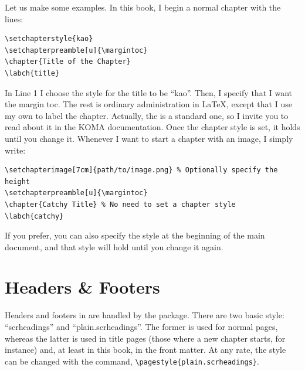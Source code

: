 Let us make some examples. In this book, I begin a normal chapter with 
the lines:
\begin{lstlisting}
\setchapterstyle{kao}
\setchapterpreamble[u]{\margintoc}
\chapter{Title of the Chapter}
\labch{title}
\end{lstlisting}

In Line 1 I choose the style for the title to be \enquote{kao}. Then, I 
specify that I want the margin toc. The rest is ordinary administration 
in \LaTeX, except that I use my own  to label the 
chapter. Actually, the  is a standard 
\KOMAScript\xspace one, so I invite you to read about it in the KOMA
documentation. Once the chapter style is set, it holds until you change 
it. Whenever I want to start a chapter with an image, 
I simply write:

\begin{lstlisting}
\setchapterimage[7cm]{path/to/image.png} % Optionally specify the height
\setchapterpreamble[u]{\margintoc}
\chapter{Catchy Title} % No need to set a chapter style
\labch{catchy}
\end{lstlisting}

If you prefer, you can also specify the style at the beginning of the 
main document, and that style will hold until you change it again.

\section{Headers \& Footers}

Headers and footers in \KOMAScript\xspace are handled by the 
 package. There are two basic style: 
\enquote{scrheadings} and \enquote{plain.scrheadings}. The former is 
used for normal pages, whereas the latter is used in title pages (those 
where a new chapter starts, for instance) and, at least in this book, in 
the front matter. At any rate, the style can be changed with the 
 command, \eg 
\lstinline|\pagestyle{plain.scrheadings}|.

